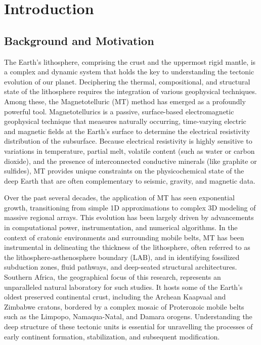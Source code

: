 \chapter{Introduction}

\section{Background and Motivation}

The Earth's lithosphere, comprising the crust and the uppermost rigid mantle, is a complex and dynamic system that holds the key to understanding the tectonic evolution of our planet. Deciphering the thermal, compositional, and structural state of the lithosphere requires the integration of various geophysical techniques. Among these, the Magnetotelluric (MT) method has emerged as a profoundly powerful tool. Magnetotellurics is a passive, surface-based electromagnetic geophysical technique that measures naturally occurring, time-varying electric and magnetic fields at the Earth's surface to determine the electrical resistivity distribution of the subsurface. Because electrical resistivity is highly sensitive to variations in temperature, partial melt, volatile content (such as water or carbon dioxide), and the presence of interconnected conductive minerals (like graphite or sulfides), MT provides unique constraints on the physicochemical state of the deep Earth that are often complementary to seismic, gravity, and magnetic data.

Over the past several decades, the application of MT has seen exponential growth, transitioning from simple 1D approximations to complex 3D modeling of massive regional arrays. This evolution has been largely driven by advancements in computational power, instrumentation, and numerical algorithms. In the context of cratonic environments and surrounding mobile belts, MT has been instrumental in delineating the thickness of the lithosphere, often referred to as the lithosphere-asthenosphere boundary (LAB), and in identifying fossilized subduction zones, fluid pathways, and deep-seated structural architectures. Southern Africa, the geographical focus of this research, represents an unparalleled natural laboratory for such studies. It hosts some of the Earth's oldest preserved continental crust, including the Archean Kaapvaal and Zimbabwe cratons, bordered by a complex mosaic of Proterozoic mobile belts such as the Limpopo, Namaqua-Natal, and Damara orogens. Understanding the deep structure of these tectonic units is essential for unravelling the processes of early continent formation, stabilization, and subsequent modification.

